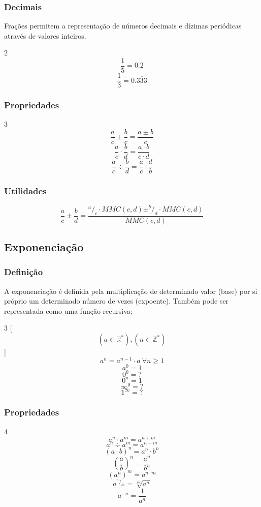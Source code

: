     \subsubsection{Decimais}
        Frações permitem a representação de números decimais e dízimas periódicas através de valores inteiros. \eg
        \begin{multicols}{2}
            \noindent\[ \frac{1}{5} = 0.2 \]
            \[ \frac{1}{3} = 0.\overline{333} \]
        \end{multicols}
    \subsubsection{Propriedades}
        \begin{multicols}{3}
            \noindent\[ \frac{a}{c} \pm \frac{b}{c} = \frac{a \pm b}{c} \]
            \[ \frac{a}{c} \cdot \frac{b}{d} = \frac{a \cdot b}{c \cdot d} \]
            \[ \frac{a}{c} \div \frac{b}{d} = \frac{a}{c} \cdot \frac{d}{b} \]
        \end{multicols}
    \subsubsection{Utilidades}
        \[ \frac{a}{c} \pm \frac{b}{d} = \frac{^a/_c \cdot MMC(c,d) \pm ^b/_d \cdot MMC(c,d)}{MMC(c,d)} \]
\subsection{Exponenciação}
    \subsubsection{Definição}
        A exponenciação é definida pela multiplicação de determinado valor (base) por si próprio um determinado número de vezes (expoente). Também pode ser representada como uma função recursiva:
        \begin{multicols}{3}
            [\[ (a \in \mathbb{R}^*),(n \in \mathbb{Z}^*) \]]
            \noindent\[ a^n = a^{n-1} \cdot a \ \forall n \geq 1 \]
            \[ a^0 = 1 \]
            \[ 0^0 = ? \]
            \[ 0^n = 1 \]
            \[ \infty ^ 0 = ? \]
            \[ 1^{\infty} = ? \]
        \end{multicols}
    \subsubsection{Propriedades}
        \begin{multicols}{4}
            \noindent\[ a^n \cdot a^m = a^{n+m} \]
            \[ a^n \div a^m = a^{n-m} \]
            \[ (a \cdot b)^n = a^n \cdot b^n \]
            \[ \left(\frac{a}{b} \right)^n = \frac{a^n}{b^n} \]
            \[ (a^n)^m = a^{n \cdot m} \]
            \[ a^{^n/_m} = \sqrt[m]{a^n} \]
            \[ a^{-n} = \frac{1}{a^n} \]
        \end{multicols}
